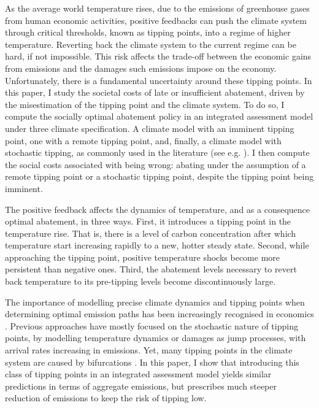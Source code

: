 \documentclass[../../main.tex]{subfiles}
\begin{document}
As the average world temperature rises, due to the emissions of greenhouse gases from human economic activities, positive feedbacks can push the climate system through critical thresholds, known as tipping points, into a regime of higher temperature. Reverting back the climate system to the current regime can be hard, if not impossible. This risk affects the trade-off between the economic gains from emissions and the damages such emissions impose on the economy. Unfortunately, there is a fundamental uncertainty around these tipping points. In this paper, I study the societal costs of late or insufficient abatement, driven by the misestimation of the tipping point and the climate system. To do so, I compute the socially optimal abatement policy in an integrated assessment model under three climate specification. A climate model with an imminent tipping point, one with a remote tipping point, and, finally, a climate model with stochastic tipping, as commonly used in the literature (see e.g. \citealt{van_der_ploeg_climate_2018,lemoine_ambiguous_2016,hambel_optimal_2021}). I then compute the social costs associated with being wrong: abating under the assumption of a remote tipping point or a stochastic tipping point, despite the tipping point being imminent.

\iffalse
    
\fi




\iffalse

The positive feedback affects the dynamics of temperature, and as a consequence optimal abatement, in three ways. First, it introduces a tipping point in the temperature rise. That is, there is a level of carbon concentration after which temperature start increasing rapidly to a new, hotter steady state. Second, while approaching the tipping point, positive temperature shocks become more persistent than negative ones. Third, the abatement levels necessary to revert back temperature to its pre-tipping levels become discontinuously large. 

The importance of modelling precise climate dynamics and tipping points when determining optimal emission paths has been increasingly recognised in economics \citep{van_den_bremer_risk-adjusted_2021,dietz_economic_2021,dietz_are_2020,taconet_social_2021,lontzek_stochastic_2015}. Previous approaches have mostly focused on the stochastic nature of tipping points, by modelling temperature dynamics \citep{dietz_economic_2021} or damages \citep{lontzek_stochastic_2015} as jump processes, with arrival rates increasing in emissions. Yet, many tipping points in the climate system are caused by bifurcations \citep{ashwin_extreme_2020,ashwin_tipping_2012}. In this paper, I show that introducing this class of tipping points in an integrated assessment model yields similar predictions in terms of aggregate emissions, but prescribes much steeper reduction of emissions to keep the risk of tipping low.
\end{document}
